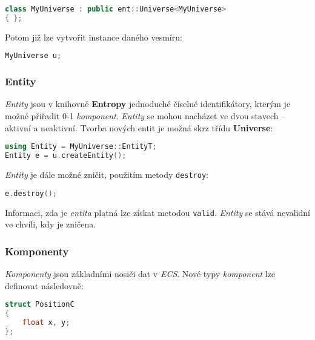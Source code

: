 \begin{lstlisting}[backgroundcolor = \color{lightgray}, language = C++, xleftmargin = 2cm, framexleftmargin = 1em, tabsize=4]
class MyUniverse : public ent::Universe<MyUniverse>
{ };
\end{lstlisting}

\noindent Potom již lze vytvořit instance daného vesmíru:

\begin{lstlisting}[backgroundcolor = \color{lightgray}, language = C++, xleftmargin = 2cm, framexleftmargin = 1em, tabsize=4]
MyUniverse u;
\end{lstlisting}

\subsubsection*{Entity}

\emph{Entity} jsou v knihovně \textbf{Entropy} jednoduché číselné identifikátory, kterým je možné přiřadit 0-1 \emph{komponent}. \emph{Entity} se mohou nacházet ve dvou stavech -- aktivní a neaktivní. Tvorba nových entit je možná skrz třídu \textbf{Universe}:

\begin{lstlisting}[backgroundcolor = \color{lightgray}, language = C++, xleftmargin = 2cm, framexleftmargin = 1em, tabsize=4]
using Entity = MyUniverse::EntityT;
Entity e = u.createEntity();
\end{lstlisting}

\noindent \emph{Entity} je dále možné zničit, použitím metody \texttt{destroy}:
\begin{lstlisting}[backgroundcolor = \color{lightgray}, language = C++, xleftmargin = 2cm, framexleftmargin = 1em, tabsize=4]
e.destroy();
\end{lstlisting}

\noindent Informaci, zda je \emph{entita} platná lze získat metodou \texttt{valid}. \emph{Entity} se stává nevalidní ve chvíli, kdy je zničena.

\subsubsection*{Komponenty}

\emph{Komponenty} jsou základními nosiči dat v \emph{ECS}. Nové typy \emph{komponent} lze definovat následovně:

\begin{lstlisting}[backgroundcolor = \color{lightgray}, language = C++, xleftmargin = 2cm, framexleftmargin = 1em, tabsize=4]
struct PositionC
{
	float x, y;
};
\end{lstlisting}

